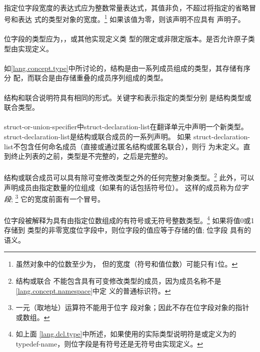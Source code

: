{\paragraph{}
指定位字段宽度的表达式应为整数常量表达式，其值非负，不超过将指定的省略冒号和表达
式的类型对象的宽度。\footnote{虽然对象中的位数至少为，
但的宽度（符号和值位数）可能只有1位。} 如果该值为零，则该声明不应具有
声明子。

\paragraph{}
位字段的类型应为，，或其他实现定义类
型的限定或非限定版本。是否允许原子类型由实现定义。

\semantic
\paragraph{}
如\ref{lang.concept.type}中所讨论的，结构是由一系列成员组成的类型，其存储有序分
配，而联合是由存储重叠的成员序列组成的类型。

\paragraph{}
结构和联合说明符具有相同的形式。关键字和表示指定的类型分别
是结构类型或联合类型。

\paragraph{}
struct-or-union-specifier中struct-declaration-list在翻译单元中声明一个新类型。
struct-declaration-list是结构或联合成员的一系列声明。 如果
struct-declaration-list不包含任何命名成员（直接或通过匿名结构或匿名联合），则行
为未定义。直到终止列表的\tm{\}}之前，类型是不完整的，之后是完整的。

\paragraph{}
结构或联合成员可以具有除可变修改类型之外的任何完整对象类型。\footnote{结构或联合
不能包含具有可变修改类型的成员，因为成员名称不是\ref{lang.concept.namespace}中定
义的普通标识符。} 此外，可以声明成员由指定数量的位组成（如果有的话包括符号位）。
这样的成员称为\textit{位字段}; \footnote{一元\tm{\&}（取地址）运算符不能用于位字
段对象；因此不存在位字段对象的指针或数组。} 它的宽度前面有一个冒号。

\paragraph{}
位字段被解释为具有由指定位数组成的有符号或无符号整数类型。\footnote{如上面
\ref{lang.dcl.type}中所述，如果使用的实际类型说明符是或定义为的
typedef-name，则位字段是有符号还是无符号由实现定义。} 如果将值0或1存储到
类型的非零宽度位字段中，则位字段的值应等于存储的值; 位字段
具有的语义。

}
